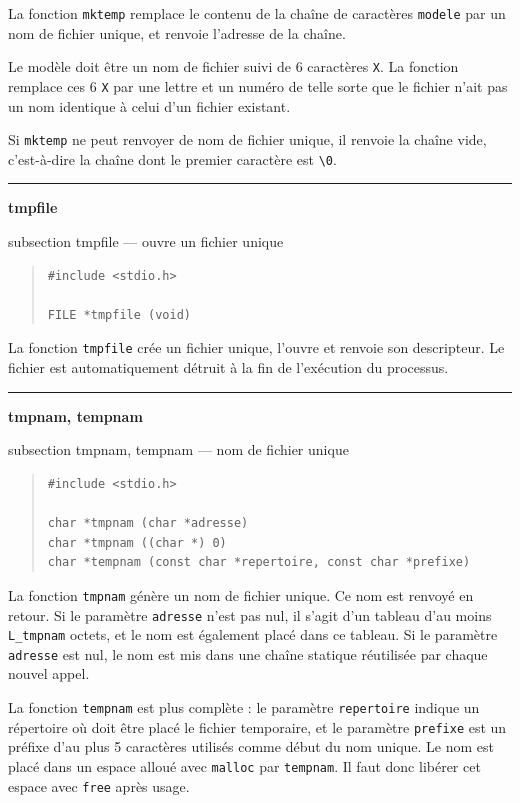 \documentclass [twoside] {report}
\newcommand {\primitive} [1]
    {
	\phantomsection
	{\large \textbf {#1}}
	\addcontentsline {toc} {subsection} {#1}
    }
\newcommand {\separation}
    {
	\vspace {5mm}
	\nopagebreak
	\hrule
    }
\begin{document}
La fonction \texttt {mktemp} remplace le contenu de la chaîne de
caractères \texttt {modele} par un nom de fichier unique, et
renvoie l'adresse de la chaîne.

Le modèle doit être un nom de fichier suivi de 6 caractères
\texttt {X}. La fonction remplace ces 6 \texttt {X} par une lettre et un
numéro de telle sorte que le fichier n'ait pas un nom
identique à celui d'un fichier existant.

Si \texttt {mktemp} ne peut renvoyer de nom de fichier unique, il
renvoie la chaîne vide, c'est-à-dire la chaîne dont le
premier caractère est \verb:\0:.



\separation 
\primitive {tmpfile} --- ouvre un fichier unique
    \label {tmpfile}

\begin {quote}
\begin {verbatim}
#include <stdio.h>

FILE *tmpfile (void)
\end{verbatim}
\end {quote}

La fonction \texttt {tmpfile} crée un fichier unique, l'ouvre et renvoie son
descripteur. Le fichier est automatiquement détruit à la fin de
l'exécution du processus.


\separation 
\primitive {tmpnam, tempnam} --- nom de fichier unique

\begin {quote}
\begin {verbatim}
#include <stdio.h>

char *tmpnam (char *adresse)
char *tmpnam ((char *) 0)
char *tempnam (const char *repertoire, const char *prefixe)
\end{verbatim}
\end {quote}

La fonction \texttt {tmpnam} génère un nom de fichier unique. Ce nom est
renvoyé en retour. Si le paramètre \texttt {adresse} n'est pas nul, il s'agit
d'un tableau d'au moins \texttt {L\_tmpnam} octets, et le nom
est également placé dans ce tableau. Si le paramètre \texttt {adresse} est
nul, le nom est mis dans une chaîne statique réutilisée par chaque
nouvel appel.

La fonction \texttt {tempnam} est plus complète : le paramètre \texttt
{repertoire} indique un répertoire où doit être placé le fichier
temporaire, et le paramètre \texttt {prefixe} est un préfixe d'au plus
5 caractères utilisés comme début du nom unique. Le nom est placé
dans un espace alloué avec \texttt {malloc} par \texttt {tempnam}. Il
faut donc libérer cet espace avec \texttt {free} après usage.
\end{document}

